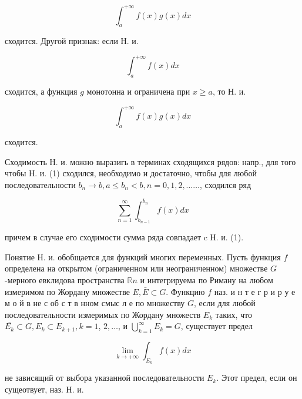 \documentclass[10pt]{article}
\begin{document}
\[

\int_{a}^{+\infty} f(x) g(x) d x

\]



сходится. Другой признак: если Н. и.



\[

\int_{a}^{+\infty} f(x) d x

\]



сходится, а функция $g$ монотонна и ограничена при $x \geqslant a$, то Н. и.



\[

\int_{a}^{+\infty} f(x) g(x) d x

\]



сходится.



Сходимость Н. и. можно выразигь в терминах сходящихся рядов: напр., для того чтобы Н. и. (1) сходился, необходимо и достаточно, чтобы для любой последовательности $b_{n} \rightarrow b, a \leqslant b_{n}<b, n=0,1,2, \ldots \ldots$, сходился ряд



\[

\sum_{n=1}^{\infty} \int_{b_{n-1}}^{b_{n}} f(x) d x

\]



причем в случае его сходимости сумма ряда совпадает c Н. и. (1).



Понятие Н. и. обобщается для функций многих переменных. Пусть функция $f$ определена на открытом (ограниченном или неограниченном) множестве $G$-мерного евклидова пространства $\mathbb{R} n$ и интегрируема по Риману на любом измеримом по Жордану множестве $E, \bar{E} \subset G$. Функцию $f$ наз. и н т е г р и р у е м о й в не с об с т в нном смыс л е по множеству $G$, если для любой последовательности измеримых по Жордану множеств $E_{k}$ таких, что $\overline{E_{k}} \subset G, E_{k} \subset E_{k+1}, k=1$, $2, \ldots$, и $\bigcup_{k=1}^{\infty} E_{k}=G$, существует предел



\[

\lim _{k \rightarrow+\infty} \int_{E_{k}} f(x) d x

\]



не зависящий от выбора указанной последовательности $E_{k}$. Этот предел, если он сущеотвует, наз. Н. и.
\end{document}
